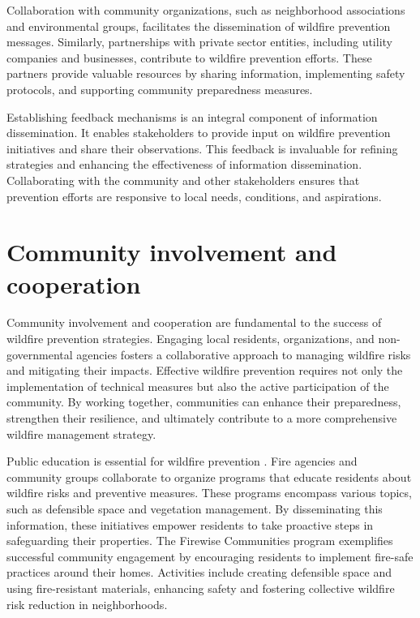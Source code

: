 \documentclass[
  12 pt,
]{Nemilov}
\begin{document}
Collaboration with community organizations, such as neighborhood associations and environmental groups, facilitates the dissemination of wildfire prevention messages. Similarly, partnerships with private sector entities, including utility companies and businesses, contribute to wildfire prevention efforts. These partners provide valuable resources by sharing information, implementing safety protocols, and supporting community preparedness measures.

Establishing feedback mechanisms is an integral component of information dissemination. It enables stakeholders to provide input on wildfire prevention initiatives and share their observations. This feedback is invaluable for refining strategies and enhancing the effectiveness of information dissemination. Collaborating with the community and other stakeholders ensures that prevention efforts are responsive to local needs, conditions, and aspirations.

\section{Community involvement and cooperation}\label{community-involvement-and-cooperation}

Community involvement and cooperation are fundamental to the success of wildfire prevention strategies. Engaging local residents, organizations, and non-governmental agencies fosters a collaborative approach to managing wildfire risks and mitigating their impacts. Effective wildfire prevention requires not only the implementation of technical measures but also the active participation of the community. By working together, communities can enhance their preparedness, strengthen their resilience, and ultimately contribute to a more comprehensive wildfire management strategy.

Public education is essential for wildfire prevention \citep{prestemon2010net}. Fire agencies and community groups collaborate to organize programs that educate residents about wildfire risks and preventive measures. These programs encompass various topics, such as defensible space and vegetation management. By disseminating this information, these initiatives empower residents to take proactive steps in safeguarding their properties. The Firewise Communities program \citep{rains2002protecting} exemplifies successful community engagement by encouraging residents to implement fire-safe practices around their homes. Activities include creating defensible space and using fire-resistant materials, enhancing safety and fostering collective wildfire risk reduction in neighborhoods.
\end{document}
